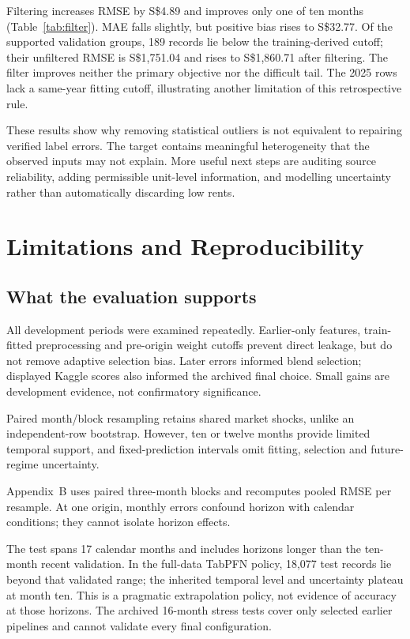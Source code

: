 \documentclass[conference]{IEEEtran}
\newcommand{\sgd}{S\$}
\begin{document}
Filtering increases RMSE by \sgd4.89 and improves only one of ten months (Table~\ref{tab:filter}). MAE falls slightly, but positive bias rises to \sgd32.77. Of the supported validation groups, 189 records lie below the training-derived cutoff; their unfiltered RMSE is \sgd1,751.04 and rises to \sgd1,860.71 after filtering. The filter improves neither the primary objective nor the difficult tail. The 2025 rows lack a same-year fitting cutoff, illustrating another limitation of this retrospective rule.

These results show why removing statistical outliers is not equivalent to repairing verified label errors. The target contains meaningful heterogeneity that the observed inputs may not explain. More useful next steps are auditing source reliability, adding permissible unit-level information, and modelling uncertainty rather than automatically discarding low rents.

\section{Limitations and Reproducibility}
\subsection{What the evaluation supports}
All development periods were examined repeatedly. Earlier-only features, train-fitted preprocessing and pre-origin weight cutoffs prevent direct leakage, but do not remove adaptive selection bias. Later errors informed blend selection; displayed Kaggle scores also informed the archived final choice. Small gains are development evidence, not confirmatory significance.

Paired month/block resampling retains shared market shocks, unlike an independent-row bootstrap. However, ten or twelve months provide limited temporal support, and fixed-prediction intervals omit fitting, selection and future-regime uncertainty.

Appendix~B uses paired three-month blocks and recomputes pooled RMSE per resample. At one origin, monthly errors confound horizon with calendar conditions; they cannot isolate horizon effects.

The test spans 17 calendar months and includes horizons longer than the ten-month recent validation. In the full-data TabPFN policy, 18,077 test records lie beyond that validated range; the inherited temporal level and uncertainty plateau at month ten. This is a pragmatic extrapolation policy, not evidence of accuracy at those horizons. The archived 16-month stress tests cover only selected earlier pipelines and cannot validate every final configuration.
\end{document}
